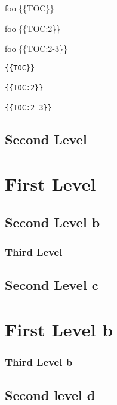 
\def\mytitle{Table of Contents}


\tableofcontents

\setcounter{tocdepth}{0}
\tableofcontents

\setcounter{tocdepth}{1}
\tableofcontents

foo \{\{TOC\}\}

foo \{\{TOC:2\}\}

foo \{\{TOC:2-3\}\}

\begin{verbatim}
{{TOC}}

{{TOC:2}}

{{TOC:2-3}}
\end{verbatim}

\chapter{Second Level}
\label{secondlevel}

\part{First Level}
\label{firstlevel}

\chapter{Second Level b}
\label{secondlevelb}

\section{Third Level}
\label{thirdlevel}

\chapter{Second Level c}
\label{secondlevelc}

\part{First Level b}
\label{firstlevelb}

\section{Third Level b}
\label{thirdlevelb}

\chapter{Second level d}
\label{secondleveld}

